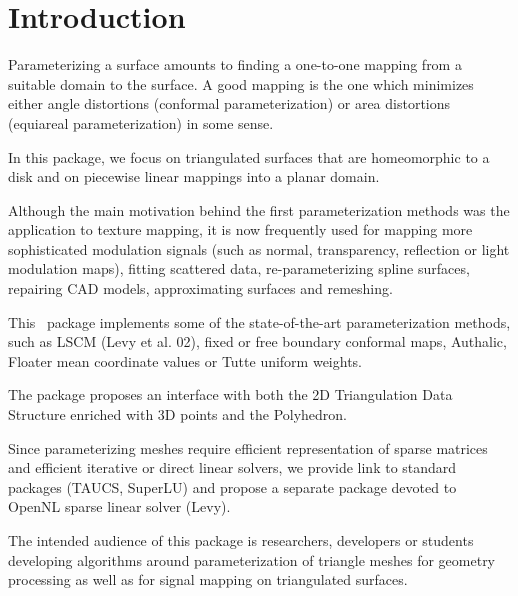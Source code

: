 \section{Introduction}

Parameterizing a surface amounts to finding a one-to-one mapping from
a suitable domain to the surface. A good mapping is the one which
minimizes either angle distortions (conformal parameterization) or
area distortions (equiareal parameterization) in some sense.

In this package, we focus on triangulated surfaces that are homeomorphic to a
disk and on piecewise linear mappings into a planar domain.

Although
the main motivation behind the first parameterization methods was the
application to texture mapping, it is now frequently used for mapping
more sophisticated modulation signals (such as normal, transparency,
reflection or light modulation maps), fitting scattered data,
re-parameterizing spline surfaces, repairing CAD models, approximating
surfaces and remeshing.

This \cgal\ package implements some of
the state-of-the-art parameterization methods, such as LSCM (Levy et
al. 02), fixed or free boundary conformal maps, Authalic, Floater mean
coordinate values or Tutte uniform weights.

The package proposes
an interface with both the 2D Triangulation Data Structure enriched
with 3D points and the Polyhedron.

Since parameterizing meshes require
efficient representation of sparse matrices and efficient iterative or
direct linear solvers, we provide link to standard packages (TAUCS, SuperLU)
and propose a separate package devoted to OpenNL sparse linear solver (Levy).

The intended audience of this package is researchers, developers or
students developing algorithms around parameterization of triangle
meshes for geometry processing as well as for signal mapping on
triangulated surfaces.

